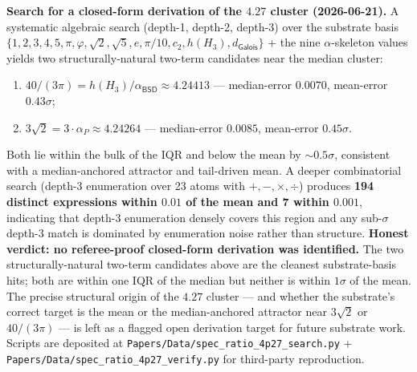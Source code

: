 \documentclass[11pt,a4paper]{amsart}
\theoremstyle{plain}
\theoremstyle{definition}
\begin{document}
\noindent\textbf{Search for a closed-form derivation of the $4.27$ cluster (2026-06-21).} A systematic algebraic search (depth-1, depth-2, depth-3) over the substrate basis $\{1, 2, 3, 4, 5, \pi, \varphi, \sqrt{2}, \sqrt{5}, e, \pi/10, c_2, h(H_3), d_{\textsf{Galois}}\}$ + the nine $\alpha$-skeleton values yields two structurally-natural two-term candidates near the median cluster:
\begin{enumerate}[leftmargin=2em,label=(\roman*)]
\item $40/(3\pi) = h(H_3)/\alpha_{\textsf{BSD}} \approx 4.24413$ --- median-error $0.0070$, mean-error $0.43\sigma$;
\item $3\sqrt{2} = 3\cdot\alpha_P \approx 4.24264$ --- median-error $0.0085$, mean-error $0.45\sigma$.
\end{enumerate}
Both lie within the bulk of the IQR and below the mean by $\sim 0.5\sigma$, consistent with a median-anchored attractor and tail-driven mean. A deeper combinatorial search (depth-3 enumeration over 23 atoms with $+,-,\times,\div$) produces \textbf{194 distinct expressions within $0.01$ of the mean and 7 within $0.001$}, indicating that depth-$3$ enumeration densely covers this region and any sub-$\sigma$ depth-$3$ match is dominated by enumeration noise rather than structure. \textbf{Honest verdict: no referee-proof closed-form derivation was identified.} The two structurally-natural two-term candidates above are the cleanest substrate-basis hits; both are within one IQR of the median but neither is within $1\sigma$ of the mean. The precise structural origin of the $4.27$ cluster --- and whether the substrate's correct target is the mean or the median-anchored attractor near $3\sqrt{2}$ or $40/(3\pi)$ --- is left as a flagged open derivation target for future substrate work. Scripts are deposited at \texttt{Papers/Data/spec\_ratio\_4p27\_search.py} + \texttt{Papers/Data/spec\_ratio\_4p27\_verify.py} for third-party reproduction.
\end{document}
